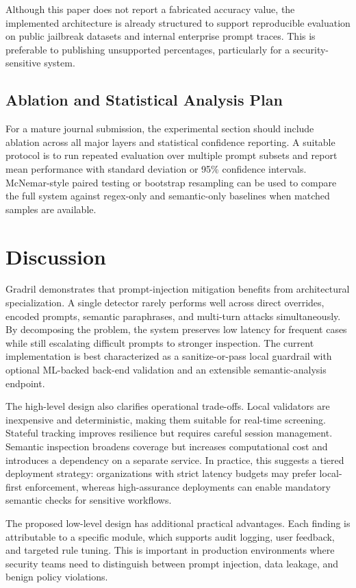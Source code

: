\documentclass[journal]{IEEEtran}
\begin{document}
Although this paper does not report a fabricated accuracy value, the implemented architecture is already structured to support reproducible evaluation on public jailbreak datasets and internal enterprise prompt traces. This is preferable to publishing unsupported percentages, particularly for a security-sensitive system.

\subsection{Ablation and Statistical Analysis Plan}
For a mature journal submission, the experimental section should include ablation across all major layers and statistical confidence reporting. A suitable protocol is to run repeated evaluation over multiple prompt subsets and report mean performance with standard deviation or 95\% confidence intervals. McNemar-style paired testing or bootstrap resampling can be used to compare the full system against regex-only and semantic-only baselines when matched samples are available.

\section{Discussion}
Gradril demonstrates that prompt-injection mitigation benefits from architectural specialization. A single detector rarely performs well across direct overrides, encoded prompts, semantic paraphrases, and multi-turn attacks simultaneously. By decomposing the problem, the system preserves low latency for frequent cases while still escalating difficult prompts to stronger inspection. The current implementation is best characterized as a sanitize-or-pass local guardrail with optional ML-backed back-end validation and an extensible semantic-analysis endpoint.

The high-level design also clarifies operational trade-offs. Local validators are inexpensive and deterministic, making them suitable for real-time screening. Stateful tracking improves resilience but requires careful session management. Semantic inspection broadens coverage but increases computational cost and introduces a dependency on a separate service. In practice, this suggests a tiered deployment strategy: organizations with strict latency budgets may prefer local-first enforcement, whereas high-assurance deployments can enable mandatory semantic checks for sensitive workflows.

The proposed low-level design has additional practical advantages. Each finding is attributable to a specific module, which supports audit logging, user feedback, and targeted rule tuning. This is important in production environments where security teams need to distinguish between prompt injection, data leakage, and benign policy violations.
\end{document}
